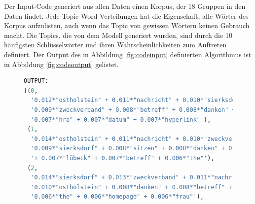 \documentclass[german,version-2020-11]{uzl-thesis}
\begin{document}
Der Input-Code generiert aus allen Daten einen Korpus, der 18 Gruppen in den Daten findet. Jede Topic-Word-Verteilungen hat die Eigenschaft, alle Wörter des Korpus aufzulisten, auch wenn das Topic von gewissen Wörtern keinen Gebrauch macht. Die Topics, die von dem Modell generiert wurden, sind durch die 10 häufigsten Schlüsselwörter und ihren Wahrscheinlichkeiten zum Auftreten definiert. Der Output des in Abbildung \ref{fig:codeinput} definierten Algorithmus ist in Abbildung \ref{fig:codeoutput} gelistet. 

\begin{figure}[H]
\begin{lstlisting}[language=Python]
OUTPUT:
[(0,
  '0.012*"ostholstein" + 0.011*"nachricht" + 0.010*"sierksdorf" + '
  '0.009*"zweckverband" + 0.008*"betreff" + 0.008*"danken" + 0.007*"email" + '
  '0.007*"hra" + 0.007*"datum" + 0.007*"hyperlink"'),
 (1,
  '0.014*"ostholstein" + 0.011*"nachricht" + 0.010*"zweckverband" + '
  '0.009*"sierksdorf" + 0.008*"sitzen" + 0.008*"danken" + 0.007*"wagrienring" '
  '+ 0.007*"lübeck" + 0.007*"betreff" + 0.006*"the"'),
 (2,
  '0.014*"sierksdorf" + 0.013*"zweckverband" + 0.011*"nachricht" + '
  '0.010*"ostholstein" + 0.008*"danken" + 0.008*"betreff" + 0.007*"sitzen" + '
  '0.006*"the" + 0.006*"homepage" + 0.006*"frau"'),
  \end{lstlisting}
  \end{figure}
  \newpage
\end{document}
